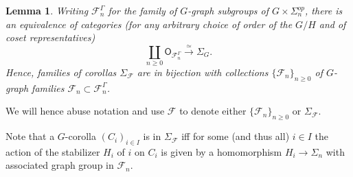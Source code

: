 \documentclass[a4paper,10pt
,draft
]{article}%
\numberwithin{equation}{section}
\numberwithin{figure}{section}
\newtheorem{lemma}[equation]{Lemma}%
\theoremstyle{definition} %
\newcommand{\F}{\ensuremath{\mathcal F}}
\newcommand{\1}{\ensuremath{\mathbbm 1}}%
\begin{document}
\begin{lemma}\label{FAMILY_COROLLAS_LEM}
Writing $\mathcal{F}_{n}^{\Gamma}$ for the family  of $G$-graph subgroups
of $G \times \Sigma_n^{op}$,
there is an equivalence of categories
(for any arbitrary choice of order of the $G/H$ and of coset representatives)
\[\coprod_{n \geq 0} \mathsf{O}_{\F_n^{\Gamma}} \xrightarrow{\simeq} \Sigma_G.\] 
Hence, families of corollas $\Sigma_{\mathcal{F}}$
are in bijection with collections
$\{\mathcal{F}_n\}_{n\geq 0}$
of $G$-graph families 
$\mathcal{F}_n \subset \mathcal{F}_{n}^{\Gamma}$.
\end{lemma}


%
%

We will hence abuse notation and use $\F$ to denote either $\{\mathcal{F}_n\}_{n \geq 0}$
or $\Sigma_\F$.

Note that a $G$-corolla $(C_i)_{i \in I}$
is in $\Sigma_{\mathcal{F}}$
iff
for some (and thus all) $i \in I$
the action of the stabilizer $H_i$ of $i$ on $C_i$
is given by a homomorphism
$H_i \to \Sigma_n$ with associated graph group in $\mathcal{F}_n$.
\end{document}
